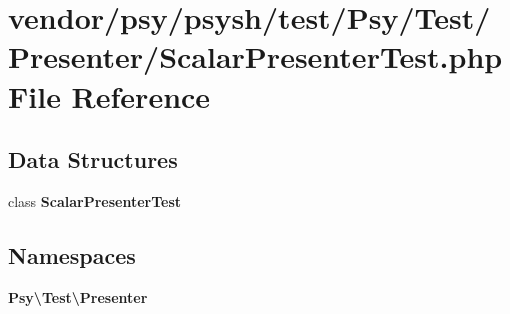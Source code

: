 \section{vendor/psy/psysh/test/\+Psy/\+Test/\+Presenter/\+Scalar\+Presenter\+Test.php File Reference}
\label{_scalar_presenter_test_8php}
\subsection*{Data Structures}
\begin{DoxyCompactItemize}
\item 
class {\bf Scalar\+Presenter\+Test}
\end{DoxyCompactItemize}
\subsection*{Namespaces}
\begin{DoxyCompactItemize}
\item 
 {\bf Psy\textbackslash{}\+Test\textbackslash{}\+Presenter}
\end{DoxyCompactItemize}
